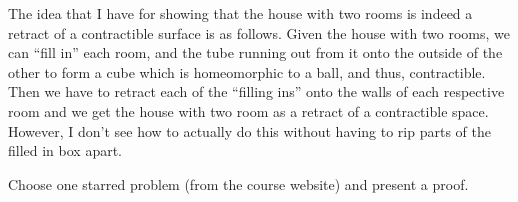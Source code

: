 \documentclass[12 pt, letterpaper]{hmcpset}
\begin{document}
\begin{solution}
\begin{enumerate}
			The idea that I have for showing that the house with two rooms is indeed a retract of a contractible surface is as follows. Given the house with two rooms, we can ``fill in'' each room, and the tube running out from it onto the outside of the other to form a cube which is homeomorphic to a ball, and thus, contractible. Then we have to retract each of the ``filling ins'' onto the walls of each respective room and we get the house with two room as a retract of a contractible space. However, I don't see how to actually do this without having to rip parts of the filled in box apart.
	\end{enumerate}
\end{solution}

\pagebreak

\begin{problem}[Problem 4]
	Choose one starred problem (from the course website) and present a proof.
\end{problem}
\end{document}
